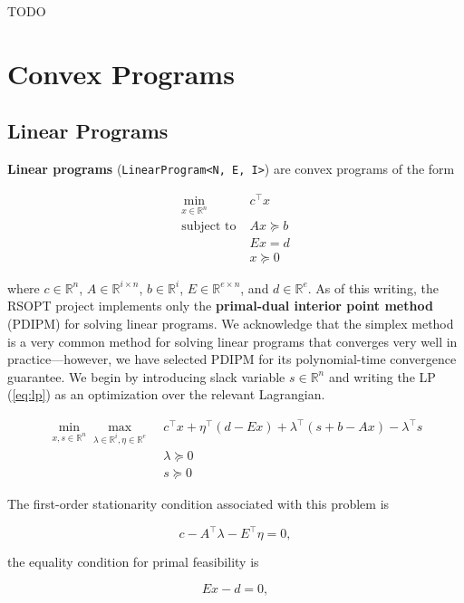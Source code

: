 \documentclass[12pt,titlepage]{report}
\begin{document}
	TODO
	
	\part{Convex Programs}
	
	\chapter{Linear Programs}
	
	\textbf{Linear programs} (\texttt{LinearProgram<N, E, I>}) are convex programs of the form
	
	\begin{align}
		\min_{x \in \mathbb{R}^n} \; & c^\top x \label{eq:lp} \\
		\text{subject to} \; & A x \succeq b \\
		& E x = d \\
		& x \succeq 0
	\end{align}
	
	where \( c \in \mathbb{R}^n \), \( A \in \mathbb{R}^{i \times n} \), \( b \in \mathbb{R}^i \), \( E \in \mathbb{R}^{e \times n} \), and \( d \in \mathbb{R}^e \).  As of this writing, the RSOPT project implements only the \textbf{primal-dual interior point method} (PDIPM) for solving linear programs.  We acknowledge that the simplex method is a very common method for solving linear programs that converges very well in practice---however, we have selected PDIPM for its polynomial-time convergence guarantee.  We begin by introducing slack variable \( s \in \mathbb{R}^n \) and writing the LP (\ref{eq:lp}) as an optimization over the relevant Lagrangian.
	
	\begin{align}
		\min_{x, s \in \mathbb{R}^n} \max_{\lambda \in \mathbb{R}^i, \eta \in \mathbb{R}^e} \; & c^\top x + \eta^\top (d - Ex) + \lambda^\top (s + b - Ax) - \lambda^\top s \\
		& \lambda \succeq 0 \\
		& s \succeq 0
	\end{align}
	
	The first-order stationarity condition associated with this problem is
	
	\begin{equation}
		c - A^\top \lambda - E^\top \eta = 0,
	\end{equation}
	
	the equality condition for primal feasibility is
	
	\begin{equation}
		E x - d = 0,
	\end{equation}
	
\end{document}
